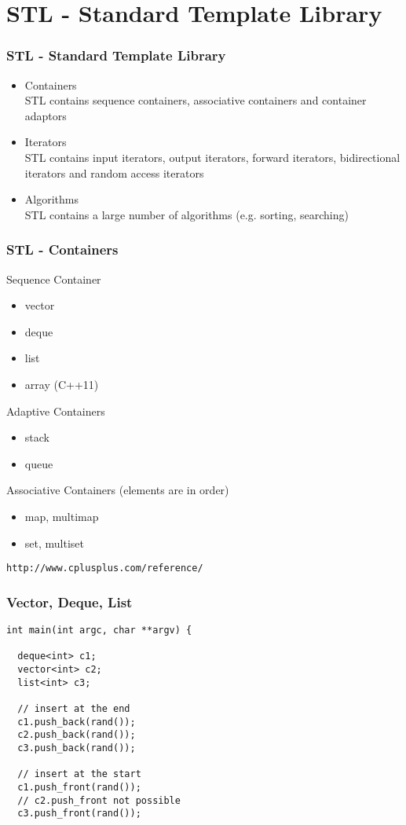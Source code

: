 \section{STL - Standard Template Library}

\begin{frame}[fragile]
  \frametitle{STL - Standard Template Library}
  \begin{itemize}
  \item Containers\\
  {\small STL contains sequence containers, associative containers and container adaptors}
  \item Iterators\\
  {\small STL contains input iterators, output iterators, forward iterators, bidirectional iterators and random access iterators}
  \item Algorithms\\
  {\small STL contains a large number of algorithms (e.g. sorting, searching)}
  \end{itemize}
\end{frame}

\begin{frame}[fragile]
  \frametitle{STL - Containers}
  Sequence Container
  {\small
  \begin{itemize}
  \item vector
  \item deque
  \item list
  \item array (C++11)
  \end{itemize}
  Adaptive Containers
  \begin{itemize}
  \item stack
  \item queue
  \end{itemize}
  Associative Containers (elements are in order)
  \begin{itemize}
  \item map, multimap
  \item set, multiset
  \end{itemize}
  \verb|http://www.cplusplus.com/reference/|
  }
\end{frame}

\begin{frame}[fragile]
\frametitle{Vector, Deque, List}
{\tiny
\begin{lstlisting}
int main(int argc, char **argv) {

  deque<int> c1;
  vector<int> c2;
  list<int> c3;

  // insert at the end
  c1.push_back(rand());
  c2.push_back(rand());
  c3.push_back(rand());

  // insert at the start
  c1.push_front(rand());
  // c2.push_front not possible
  c3.push_front(rand());
\end{lstlisting}
}
\end{frame}

